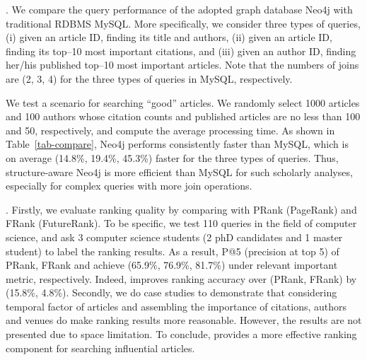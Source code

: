 



.
We compare the query performance of the adopted graph database Neo4j with traditional RDBMS MySQL. More specifically, we consider three types of queries, \ie (i) given an article ID, finding its title and authors, (ii)  given an article ID, finding its top--10 most important citations, and (iii) given an author ID, finding her/his published top--10 most important articles. Note that the numbers of joins are (2, 3, 4) for the three types of queries in MySQL, respectively.

We test a scenario for searching ``good'' articles. We randomly select 1000 articles and 100 authors whose citation counts and published articles are no less than 100 and 50, respectively, and compute the average processing time. As shown in Table~\ref{tab-compare}, Neo4j performs consistently faster than MySQL, which is on average (14.8\%, 19.4\%, 45.3\%) faster for the three types of queries.
Thus, structure-aware Neo4j is more efficient than MySQL for such scholarly analyses, especially for complex queries with more join operations.


.
Firstly, we evaluate ranking quality by comparing with PRank (PageRank) and FRank (FutureRank).
To be specific, we test 110 queries in the field of computer science, and ask 3 computer science students (2 phD candidates and 1 master student) to label the ranking results. As a result, P@5 (precision at top 5) of PRank, FRank and \oursystem achieve (65.9\%, 76.9\%, 81.7\%) under relevant important metric, respectively. 
Indeed, \oursystem improves ranking accuracy over (PRank, FRank) by (15.8\%, 4.8\%).
Secondly, we do case studies to demonstrate that considering temporal factor of articles and assembling the importance of citations, authors and venues do make ranking results more reasonable. However, the results are not presented due to space limitation.
To conclude, \oursystem provides a more effective ranking component for searching influential articles. %





